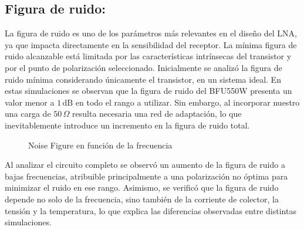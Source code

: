 \subsection{Figura de ruido:}
La figura de ruido es uno de los parámetros más relevantes en el diseño del LNA, ya que impacta directamente en la sensibilidad del receptor. La mínima figura de ruido alcanzable está limitada por las características intrínsecas del transistor y por el punto de polarización seleccionado.
Inicialmente se analizó la figura de ruido mínima  considerando únicamente el transistor, en un sistema ideal. En estas simulaciones se observan que la figura de ruido del BFU550W presenta un valor menor a $1\,\text{dB}$ en todo el rango a utilizar. Sin embargo, al incorporar nuestro
una carga de $50\,\Omega$ resulta necesaria una red de adaptación, lo que inevitablemente introduce un incremento en la figura de ruido total.
\begin{figure}[htbp]
\centering
{}
\caption{Noise Figure en función de la frecuencia}
\label{fig:nf_vs_freq}
\end{figure}
Al analizar el circuito completo se observó un aumento de la figura de ruido a bajas frecuencias, atribuible principalmente a una polarización no óptima para minimizar el ruido en ese rango. Asimismo, se verificó que la figura de ruido depende no solo de la frecuencia, sino también de la corriente de colector, la tensión  y la temperatura, lo que explica las diferencias observadas entre distintas simulaciones.

